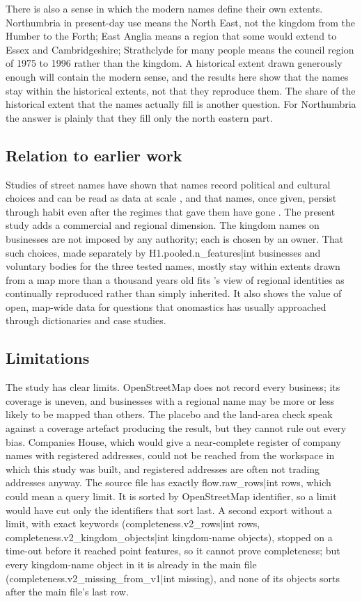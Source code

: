 \documentclass[11pt,a4paper]{article}
\begin{document}
There is also a sense in which the modern names define their own extents. Northumbria in present-day use means the North East, not the kingdom from the Humber to the Forth; East Anglia means a region that some would extend to Essex and Cambridgeshire; Strathclyde for many people means the council region of 1975 to 1996 rather than the kingdom. A historical extent drawn generously enough will contain the modern sense, and the results here show that the names stay within the historical extents, not that they reproduce them. The share of the historical extent that the names actually fill is another question. For Northumbria the answer is plainly that they fill only the north eastern part.

\subsection{Relation to earlier work}
Studies of street names have shown that names record political and cultural choices and can be read as data at scale \citep{azaryahu1996,alderman2000,otoperalias2018,bancilhon2021,gutierrez2022}, and that names, once given, persist through habit even after the regimes that gave them have gone \citep{lightyoung2014}. The present study adds a commercial and regional dimension. The kingdom names on businesses are not imposed by any authority; each is chosen by an owner. That such choices, made separately by {{H1.pooled.n_features|int}} businesses and voluntary bodies for the three tested names, mostly stay within extents drawn from a map more than a thousand years old fits \citet{paasi2003}'s view of regional identities as continually reproduced rather than simply inherited. It also shows the value of open, map-wide data for questions that onomastics has usually approached through dictionaries and case studies.

\subsection{Limitations}
The study has clear limits. OpenStreetMap does not record every business; its coverage is uneven, and businesses with a regional name may be more or less likely to be mapped than others. The placebo and the land-area check speak against a coverage artefact producing the result, but they cannot rule out every bias. Companies House, which would give a near-complete register of company names with registered addresses, could not be reached from the workspace in which this study was built, and registered addresses are often not trading addresses anyway. The source file has exactly {{flow.raw_rows|int}} rows, which could mean a query limit. It is sorted by OpenStreetMap identifier, so a limit would have cut only the identifiers that sort last. A second export without a limit, with exact keywords ({{completeness.v2_rows|int}} rows, {{completeness.v2_kingdom_objects|int}} kingdom-name objects), stopped on a time-out before it reached point features, so it cannot prove completeness; but every kingdom-name object in it is already in the main file ({{completeness.v2_missing_from_v1|int}} missing), and none of its objects sorts after the main file's last row.
\end{document}
